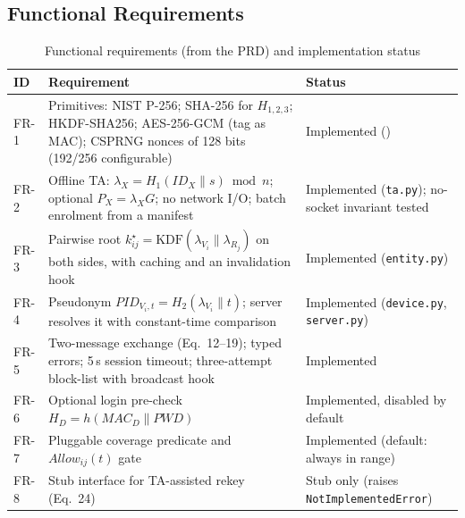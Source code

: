 \documentclass[12pt,a4paper,oneside]{report}
\numberwithin{equation}{chapter}
\begin{document}
\subsection{Functional Requirements}
\begin{table}[H]
\centering
\caption{Functional requirements (from the PRD) and implementation status}
\label{tab:fr}
\small
\begin{tabularx}{\textwidth}{|P{0.1\textwidth}|Y|P{0.2\textwidth}|}
\hline
\textbf{ID} & \textbf{Requirement} & \textbf{Status}\\ \hline
FR-1 & Primitives: NIST P-256; SHA-256 for $H_{1,2,3}$; HKDF-SHA256; AES-256-GCM (tag as MAC); CSPRNG nonces of 128 bits (192/256 configurable) & Implemented ()\\ \hline
FR-2 & Offline TA: $\lambda_X = H_1(ID_X\|s) \bmod n$; optional $P_X=\lambda_X G$; no network I/O; batch enrolment from a manifest & Implemented (\texttt{ta.py}); no-socket invariant tested\\ \hline
FR-3 & Pairwise root $k^\star_{ij}=\mathrm{KDF}(\lambda_{V_i}\|\lambda_{R_j})$ on both sides, with caching and an invalidation hook & Implemented (\texttt{entity.py})\\ \hline
FR-4 & Pseudonym $PID_{V_i,t}=H_2(\lambda_{V_i}\|t)$; server resolves it with constant-time comparison & Implemented (\texttt{device.py}, \texttt{server.py})\\ \hline
FR-5 & Two-message exchange (Eq.~12--19); typed errors; 5\,s session timeout; three-attempt block-list with broadcast hook & Implemented\\ \hline
FR-6 & Optional login pre-check $H_D=h(MAC_D\|PWD)$ & Implemented, disabled by default\\ \hline
FR-7 & Pluggable coverage predicate and $Allow_{ij}(t)$ gate & Implemented (default: always in range)\\ \hline
FR-8 & Stub interface for TA-assisted rekey (Eq.~24) & Stub only (raises \texttt{NotImplemented\-Error})\\ \hline
\end{tabularx}
\end{table}
\end{document}
